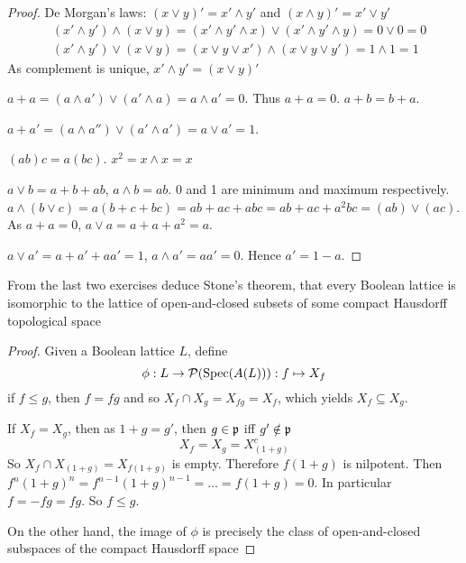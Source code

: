 \documentclass[11pt]{article}
\begin{document}
\begin{proof}
De Morgan's laws: \((x\vee y)'=x'\wedge y'\) and \((x\wedge y)'=x'\vee y'\)
\begin{align*}
&(x'\wedge y')\wedge(x\vee y)=(x'\wedge y'\wedge x)\vee(x'\wedge y'\wedge y)=0\vee 0=0\\
&(x'\wedge y')\vee(x\vee y)=(x\vee y\vee x')\wedge(x\vee y\vee y')=1\wedge 1=1
\end{align*}
As complement is unique, \(x'\wedge y'=(x\vee y)'\)

\(a+a=(a\wedge a')\vee(a'\wedge a)=a\wedge a'=0\). Thus \(a+a=0\). \(a+b=b+a\).

\(a+a'=(a\wedge a'')\vee(a'\wedge a')=a\vee a'=1\).

\((ab)c=a(bc)\). \(x^2=x\wedge x=x\)


\(a\vee b=a+b+ab\), \(a\wedge b=ab\). 0 and 1 are minimum and maximum respectively.
\(a\wedge(b\vee c)=a(b+c+bc)=ab+ac+abc=ab+ac+a^2bc=(ab)\vee(ac)\). As \(a+a=0\),
\(a\vee a=a+a+a^2=a\).

\(a\vee a'=a+a'+aa'=1\), \(a\wedge a'=aa'=0\). Hence \(a'=1-a\).
\end{proof}

\begin{exercise}
\label{ex1.25}
From the last two exercises deduce Stone's theorem, that every Boolean lattice is isomorphic to
the lattice of open-and-closed subsets of some compact Hausdorff topological space
\end{exercise}

\begin{proof}
Given a Boolean lattice \(L\), define
\begin{equation*}
\phi:L\to\mathcal{P}(\operatorname{Spec}(A(L))):f\mapsto X_f
\end{equation*}
if \(f\le g\), then \(f=fg\) and so \(X_f\cap X_g=X_{fg}=X_f\), which yields \(X_f\subseteq X_g\).

If \(X_f=X_g\), then as \(1+g=g'\), then \(g\in\mathfrak{p}\) iff \(g'\notin\mathfrak{p}\)
\begin{equation*}
X_f=X_g=X_{(1+g)}^c
\end{equation*}
So \(X_f\cap X_{(1+g)}=X_{f(1+g)}\) is empty. Therefore \(f(1+g)\) is nilpotent.
Then \(f^n(1+g)^n=f^{n-1}(1+g)^{n-1}=\dots=f(1+g)=0\). In particular \(f=-fg=fg\). So \(f\le g\).

On the other hand, the image of \(\phi\) is precisely the class of open-and-closed subspaces of the
compact Hausdorff space
\end{proof}
\end{document}
